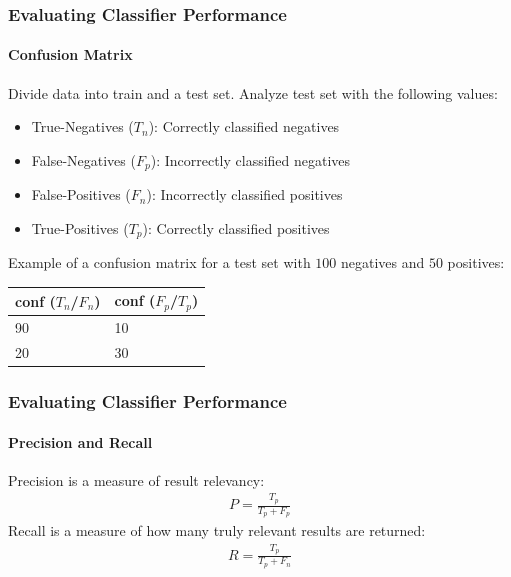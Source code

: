 \documentclass{beamer}
\begin{document}
\begin{frame}[noframenumbering]
    \frametitle{Evaluating Classifier Performance}
    \framesubtitle{Confusion Matrix}     %
\par Divide data into train and a test set. Analyze test set with the following values:
      \begin{itemize}
      \item True-Negatives ($T_n$): Correctly classified negatives
      \item False-Negatives ($F_p$): Incorrectly classified negatives
      \item False-Positives ($F_n$): Incorrectly classified positives
      \item True-Positives ($T_p$): Correctly classified positives
    \end{itemize}
    \par Example of a confusion matrix for a test set with $100$ negatives and $50$ positives:
    \begin{table}[H]
    \centering
    \label{tab:confEx}
    \begin{tabular}{|l||l|}\hline
    conf ($T_n$/$F_n$) & conf ($F_p$/$T_p$) \\ \hline
    90 & 10 \\ \hline
    20 & 30 \\ \hline
    \end{tabular}
    \end{table}
\end{frame}
\begin{frame}[noframenumbering]
    \frametitle{Evaluating Classifier Performance}  %
    \framesubtitle{Precision and Recall}
    Precision is a measure of result relevancy:
    \begin{equation}
    \label{eq:precision}
    \begin{aligned}
    P = \frac{T_p}{T_p+F_p}
    \end{aligned}
    \end{equation}
    Recall is a measure of how many truly relevant results are returned:
    \begin{equation}
    \label{eq:recall}
    \begin{aligned}
    R = \frac{T_p}{T_p+F_n}
    \end{aligned}
    \end{equation}
\end{frame}
\end{document}
